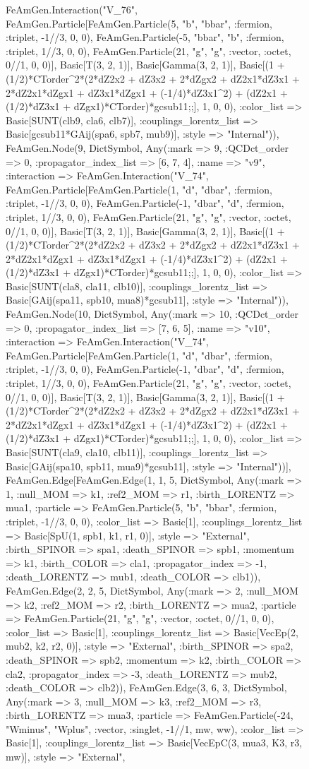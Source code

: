 \documentclass{revtex4}
\begin{document}
\begin{figure}[!htb]
\begin{center}
{FeAmGen.Interaction("V_76", FeAmGen.Particle[FeAmGen.Particle(5, "b", "bbar", :fermion, :triplet, -1//3, 0, 0), FeAmGen.Particle(-5, "bbar", "b", :fermion, :triplet, 1//3, 0, 0), FeAmGen.Particle(21, "g", "g", :vector, :octet, 0//1, 0, 0)], Basic[T(3, 2, 1)], Basic[Gamma(3, 2, 1)], Basic[(1 + (1/2)*CTorder^2*(2*dZ2x2 + dZ3x2 + 2*dZgx2 + dZ2x1*dZ3x1 + 2*dZ2x1*dZgx1 + dZ3x1*dZgx1 + (-1/4)*dZ3x1^2) + (dZ2x1 + (1/2)*dZ3x1 + dZgx1)*CTorder)*gcsub11;;], 1, 0, 0), :color_list => Basic[SUNT(clb9, cla6, clb7)], :couplings_lorentz_list => Basic[gcsub11*GAij(spa6, spb7, mub9)], :style => "Internal")), FeAmGen.Node(9, Dict{Symbol, Any}(:mark => 9, :QCDct_order => 0, :propagator_index_list => [6, 7, 4], :name => "v9", :interaction => FeAmGen.Interaction("V_74", FeAmGen.Particle[FeAmGen.Particle(1, "d", "dbar", :fermion, :triplet, -1//3, 0, 0), FeAmGen.Particle(-1, "dbar", "d", :fermion, :triplet, 1//3, 0, 0), FeAmGen.Particle(21, "g", "g", :vector, :octet, 0//1, 0, 0)], Basic[T(3, 2, 1)], Basic[Gamma(3, 2, 1)], Basic[(1 + (1/2)*CTorder^2*(2*dZ2x2 + dZ3x2 + 2*dZgx2 + dZ2x1*dZ3x1 + 2*dZ2x1*dZgx1 + dZ3x1*dZgx1 + (-1/4)*dZ3x1^2) + (dZ2x1 + (1/2)*dZ3x1 + dZgx1)*CTorder)*gcsub11;;], 1, 0, 0), :color_list => Basic[SUNT(cla8, cla11, clb10)], :couplings_lorentz_list => Basic[GAij(spa11, spb10, mua8)*gcsub11], :style => "Internal")), FeAmGen.Node(10, Dict{Symbol, Any}(:mark => 10, :QCDct_order => 0, :propagator_index_list => [7, 6, 5], :name => "v10", :interaction => FeAmGen.Interaction("V_74", FeAmGen.Particle[FeAmGen.Particle(1, "d", "dbar", :fermion, :triplet, -1//3, 0, 0), FeAmGen.Particle(-1, "dbar", "d", :fermion, :triplet, 1//3, 0, 0), FeAmGen.Particle(21, "g", "g", :vector, :octet, 0//1, 0, 0)], Basic[T(3, 2, 1)], Basic[Gamma(3, 2, 1)], Basic[(1 + (1/2)*CTorder^2*(2*dZ2x2 + dZ3x2 + 2*dZgx2 + dZ2x1*dZ3x1 + 2*dZ2x1*dZgx1 + dZ3x1*dZgx1 + (-1/4)*dZ3x1^2) + (dZ2x1 + (1/2)*dZ3x1 + dZgx1)*CTorder)*gcsub11;;], 1, 0, 0), :color_list => Basic[SUNT(cla9, cla10, clb11)], :couplings_lorentz_list => Basic[GAij(spa10, spb11, mua9)*gcsub11], :style => "Internal"))], FeAmGen.Edge[FeAmGen.Edge(1, 1, 5, Dict{Symbol, Any}(:mark => 1, :null_MOM => k1, :ref2_MOM => r1, :birth_LORENTZ => mua1, :particle => FeAmGen.Particle(5, "b", "bbar", :fermion, :triplet, -1//3, 0, 0), :color_list => Basic[1], :couplings_lorentz_list => Basic[SpU(1, spb1, k1, r1, 0)], :style => "External", :birth_SPINOR => spa1, :death_SPINOR => spb1, :momentum => k1, :birth_COLOR => cla1, :propagator_index => -1, :death_LORENTZ => mub1, :death_COLOR => clb1)), FeAmGen.Edge(2, 2, 5, Dict{Symbol, Any}(:mark => 2, :null_MOM => k2, :ref2_MOM => r2, :birth_LORENTZ => mua2, :particle => FeAmGen.Particle(21, "g", "g", :vector, :octet, 0//1, 0, 0), :color_list => Basic[1], :couplings_lorentz_list => Basic[VecEp(2, mub2, k2, r2, 0)], :style => "External", :birth_SPINOR => spa2, :death_SPINOR => spb2, :momentum => k2, :birth_COLOR => cla2, :propagator_index => -3, :death_LORENTZ => mub2, :death_COLOR => clb2)), FeAmGen.Edge(3, 6, 3, Dict{Symbol, Any}(:mark => 3, :null_MOM => k3, :ref2_MOM => r3, :birth_LORENTZ => mua3, :particle => FeAmGen.Particle(-24, "Wminus", "Wplus", :vector, :singlet, -1//1, mw, ww), :color_list => Basic[1], :couplings_lorentz_list => Basic[VecEpC(3, mua3, K3, r3, mw)], :style => "External", }
\end{center}
\end{figure}
\end{document}
